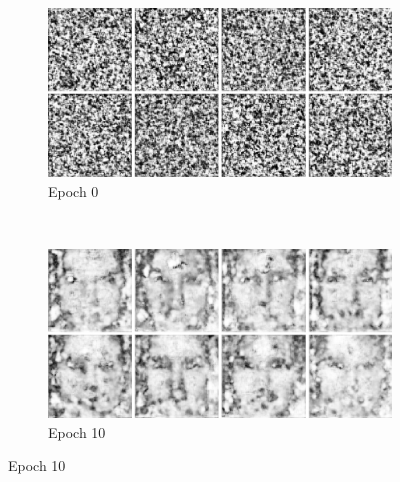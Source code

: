 \begin{figure}
    \centering
    \begin{subfigure}[b]{0.45\textwidth}
        \includegraphics[width=\textwidth]{fig/dcgan/caltech/epoch0}
        \caption{Epoch 0}
    \end{subfigure}
    ~
    \begin{subfigure}[b]{0.45\textwidth}
        \includegraphics[width=\textwidth]{fig/dcgan/caltech/epoch200}
        \caption{Epoch 10}
    \end{subfigure}


\end{figure}
